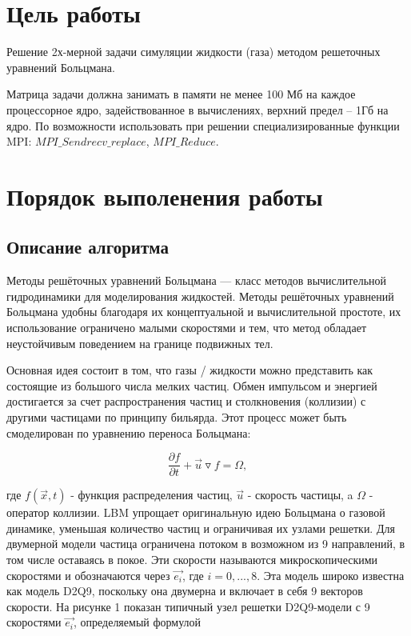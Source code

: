 	\section{Цель работы}
		Решение 2х-мерной задачи симуляции жидкости (газа) методом решеточных уравнений Больцмана.
		
		Матрица задачи должна занимать в памяти не менее 100 Мб на каждое процессорное ядро, задействованное в вычислениях, верхний предел – 1Гб на ядро. По возможности использовать при решении специализированные функции MPI: $ MPI\_Sendrecv\_replace $, $  MPI\_Reduce $.
		
	\clearpage
	\section{Порядок выполенения работы}
	
		\subsection{Описание алгоритма}
			Методы решёточных уравнений Больцмана — класс методов вычислительной гидродинамики для моделирования жидкостей. Методы решёточных уравнений Больцмана удобны благодаря их концептуальной и вычислительной простоте, их использование ограничено малыми скоростями и тем, что метод обладает неустойчивым поведением на границе подвижных тел.
			
			Основная идея состоит в том, что газы / жидкости можно представить как состоящие из большого числа мелких частиц. Обмен импульсом и энергией достигается за счет распространения частиц и столкновения (коллизии) с другими частицами по принципу бильярда. Этот процесс может быть смоделирован по уравнению переноса Больцмана:
			
			\[ \dfrac{\partial f}{\partial t} +\vec{u}\triangledown f = \Omega ,\]
			
			где $ f(\vec{x},t) $ - функция распределения частиц, $ \vec{u} $ - скорость частицы, a $ \Omega $ - оператор коллизии. LBM упрощает оригинальную идею Больцмана о газовой динамике, уменьшая количество частиц и ограничивая их узлами решетки. Для двумерной модели частица ограничена потоком в возможном из 9 направлений, в том числе оставаясь в покое. Эти скорости называются микроскопическими скоростями и обозначаются через $ \vec{e_i} $, где $ i = 0,... , 8 $. Эта модель широко известна как модель D2Q9, поскольку она двумерна и включает в себя 9 векторов скорости. На рисунке 1 показан типичный узел решетки D2Q9-модели с 9 скоростями $ \vec{e_i} $, определяемый формулой
			
